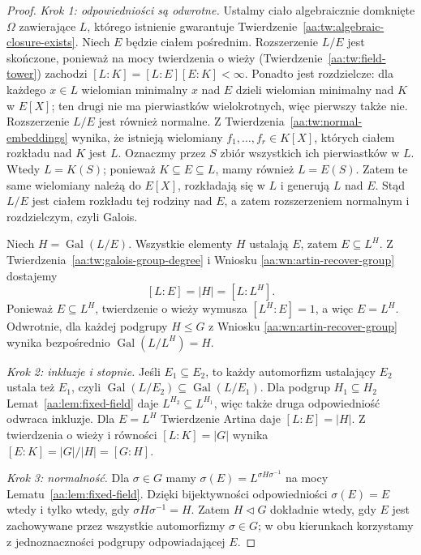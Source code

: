 \begin{proof}
\emph{Krok 1: odpowiedniości są odwrotne.}
Ustalmy ciało algebraicznie domknięte $\Omega$ zawierające $L$,
którego istnienie gwarantuje Twierdzenie~\ref{aa:tw:algebraic-closure-exists}.
Niech $E$ będzie ciałem pośrednim. Rozszerzenie $L/E$
jest skończone, ponieważ na mocy twierdzenia o wieży
(Twierdzenie~\ref{aa:tw:field-tower}) zachodzi
$[L:K]=[L:E][E:K]<\infty$.
Ponadto jest rozdzielcze: dla każdego $x\in L$
wielomian minimalny $x$ nad $E$ dzieli wielomian
minimalny nad $K$ w $E[X]$; ten drugi nie ma
pierwiastków wielokrotnych, więc pierwszy także nie.
Rozszerzenie $L/E$ jest również normalne. Z
Twierdzenia~\ref{aa:tw:normal-embeddings} wynika,
że istnieją wielomiany $f_1,\ldots,f_r\in K[X]$,
których ciałem rozkładu nad $K$ jest $L$.
Oznaczmy przez $S$ zbiór wszystkich ich pierwiastków
w $L$. Wtedy $L=K(S)$; ponieważ
$K\subseteq E\subseteq L$, mamy również $L=E(S)$.
Zatem te same wielomiany należą do $E[X]$, rozkładają
się w $L$ i generują $L$ nad $E$.
Stąd $L/E$ jest ciałem rozkładu tej rodziny nad $E$,
a zatem rozszerzeniem normalnym i rozdzielczym,
czyli Galois.

Niech $H=\operatorname{Gal}(L/E)$. Wszystkie elementy
$H$ ustalają $E$, zatem $E\subseteq L^H$.
Z Twierdzenia~\ref{aa:tw:galois-group-degree} i Wniosku
\ref{aa:wn:artin-recover-group} dostajemy
\[
[L:E]=|H|=[L:L^H].
\]
Ponieważ $E\subseteq L^H$, twierdzenie o wieży
wymusza $[L^H:E]=1$, a więc $E=L^H$.
Odwrotnie, dla każdej podgrupy $H\le G$ z Wniosku
\ref{aa:wn:artin-recover-group} wynika bezpośrednio
$\operatorname{Gal}(L/L^H)=H$.

\emph{Krok 2: inkluzje i stopnie.} Jeśli
$E_1\subseteq E_2$, to każdy automorfizm ustalający
$E_2$ ustala też $E_1$, czyli
$\operatorname{Gal}(L/E_2)\subseteq\operatorname{Gal}(L/E_1)$.
Dla podgrup $H_1\subseteq H_2$
Lemat~\ref{aa:lem:fixed-field} daje
$L^{H_2}\subseteq L^{H_1}$, więc także druga
odpowiedniość odwraca inkluzje. Dla $E=L^H$
Twierdzenie Artina daje $[L:E]=|H|$. Z twierdzenia
o wieży i równości $[L:K]=|G|$ wynika
$[E:K]=|G|/|H|=[G:H]$.

\emph{Krok 3: normalność.} Dla $\sigma\in G$ mamy
$\sigma(E)=L^{\sigma H\sigma^{-1}}$ na mocy
Lematu~\ref{aa:lem:fixed-field}.
Dzięki bijektywności odpowiedniości
$\sigma(E)=E$ wtedy i tylko wtedy, gdy
$\sigma H\sigma^{-1}=H$.
Zatem $H\triangleleft G$ dokładnie wtedy, gdy
$E$ jest zachowywane przez wszystkie automorfizmy
$\sigma\in G$; w obu kierunkach korzystamy z
jednoznaczności podgrupy odpowiadającej $E$.


\end{proof}
